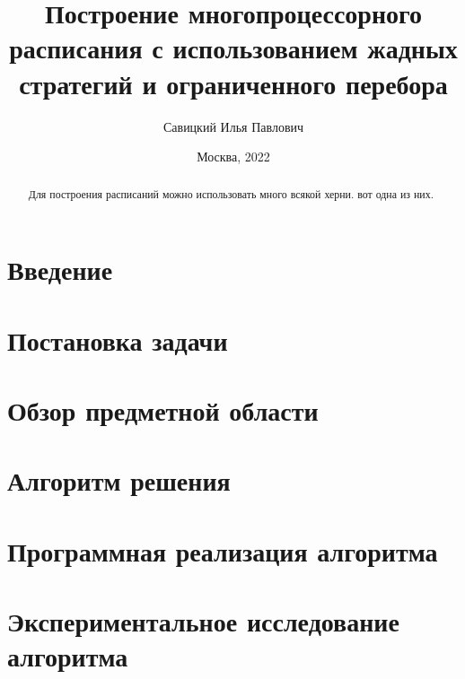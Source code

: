 \documentclass[12pt]{article}
\author{Савицкий Илья Павлович}
\title{Построение многопроцессорного расписания с использованием жадных стратегий и ограниченного перебора}
\date{Москва, 2022}
\begin{document}

\newpage
\begin{abstract}
    Для построения расписаний можно использовать много всякой херни. вот одна из них.
\end{abstract}
\newpage
\tableofcontents
\newpage
\section{Введение}

\newpage
\section{Постановка задачи}

\newpage
\section{Обзор предметной области}


\newpage
\section{Алгоритм решения}


\newpage
\section{Программная реализация алгоритма}


\newpage
\section{Экспериментальное исследование алгоритма}

\end{document}
